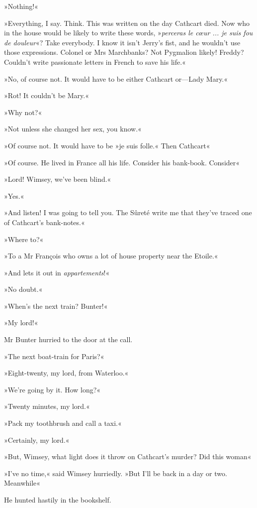 »Nothing!«

»Everything, I say. Think. This was written on the day Cathcart died. Now who in the house would be likely to write these words, »\textit{perceras le cœur ... je suis fou de douleur}«? Take everybody. I know it isn't Jerry's fist, and he wouldn't use those expressions. Colonel or Mrs Marchbanks? Not Pygmalion likely! Freddy? Couldn't write passionate letters in French to save his life.«

»No, of course not. It would have to be either Cathcart or\allowbreak---\allowbreak Lady Mary.«

»Rot! It couldn't be Mary.«

»Why not?«

»Not unless she changed her sex, you know.«

»Of course not. It would have to be »je suis folle.« Then Cathcart\longdash«

»Of course. He lived in France all his life. Consider his bank-book. Consider\longdash«

»Lord! Wimsey, we've been blind.«

»Yes.«

»And listen! I was going to tell you. The Sûreté write me that they've traced one of Cathcart's bank-notes.«

»Where to?«

»To a Mr François who owns a lot of house property near the Etoile.«

»And lets it out in \textit{appartements}!«

»No doubt.«

»When's the next train? Bunter!«

»My lord!«

Mr Bunter hurried to the door at the call.

»The next boat-train for Paris?«

»Eight-twenty, my lord, from Waterloo.«

»We're going by it. How long?«

»Twenty minutes, my lord.«

»Pack my toothbrush and call a taxi.«

»Certainly, my lord.«

»But, Wimsey, what light does it throw on Cathcart's murder? Did this woman\longdash«

»I've no time,« said Wimsey hurriedly. »But I'll be back in a day or two. Meanwhile\longdash«

He hunted hastily in the bookshelf.

